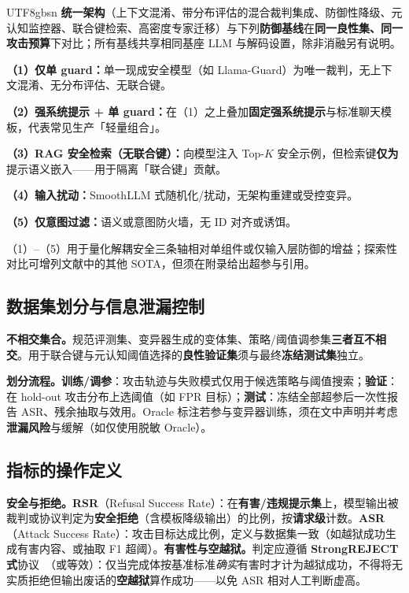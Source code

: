 \documentclass[letterpaper,twocolumn,10pt]{article}
\begin{document}
\begin{CJK}{UTF8}{gbsn}
\textbf{统一架构}（上下文混淆、带分布评估的混合裁判集成、防御性降级、元认知监控器、联合键检索、高密度专家迁移）与下列\textbf{防御基线}在\textbf{同一良性集、同一攻击预算}下对比；所有基线共享相同基座 LLM 与解码设置，除非消融另有说明。

\textbf{（1）仅单 guard：}单一现成安全模型（如 Llama-Guard）为唯一裁判，无上下文混淆、无分布评估、无联合键。

\textbf{（2）强系统提示 + 单 guard：}在（1）之上叠加\textbf{固定强系统提示}与标准聊天模板，代表常见生产「轻量组合」。

\textbf{（3）RAG 安全检索（无联合键）：}向模型注入 Top-$K$ 安全示例，但检索键\textbf{仅为}提示语义嵌入——用于隔离「联合键」贡献。

\textbf{（4）输入扰动：}SmoothLLM 式随机化/扰动，无架构重建或受控变异。

\textbf{（5）仅意图过滤：}语义或意图防火墙，无 ID 对齐或诱饵。

（1）--（5）用于量化解耦安全三条轴相对单组件或仅输入层防御的增益；探索性对比可增列文献中的其他 SOTA，但须在附录给出超参与引用。

\subsection{数据集划分与信息泄漏控制}
\label{sec:eval-splits}

\textbf{不相交集合。}规范评测集、变异器生成的变体集、策略/阈值调参集\textbf{三者互不相交}。用于联合键与元认知阈值选择的\textbf{良性验证集}须与最终\textbf{冻结测试集}独立。

\textbf{划分流程。}\textbf{训练/调参}：攻击轨迹与失败模式仅用于候选策略与阈值搜索；\textbf{验证}：在 hold-out 攻击分布上选阈值（如 FPR 目标）；\textbf{测试}：冻结全部超参后一次性报告 ASR、残余抽取与效用。Oracle 标注若参与变异器训练，须在文中声明并考虑\textbf{泄漏风险}与缓解（如仅使用脱敏 Oracle）。

\subsection{指标的操作定义}
\label{sec:eval-metrics}

\textbf{安全与拒绝。}\textbf{RSR}（Refusal Success Rate）：在\textbf{有害/违规提示集}上，模型输出被裁判或协议判定为\textbf{安全拒绝}（含模板降级输出）的比例，按\textbf{请求级}计数。\textbf{ASR}（Attack Success Rate）：攻击目标达成比例，定义与数据集一致（如越狱成功生成有害内容、或抽取 F1 超阈）。\textbf{有害性与空越狱。}判定应遵循 \textbf{StrongREJECT 式}协议~\cite{strongreject}（或等效）：仅当完成体按基准标准\emph{确实}有害时才计为越狱成功，不得将无实质拒绝但输出废话的\textbf{空越狱}算作成功——以免 ASR 相对人工判断虚高。


\end{CJK}
\end{document}
